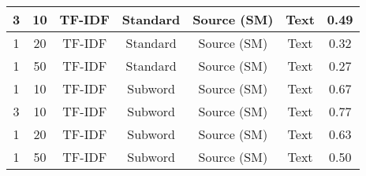 \begin{longtable}{|c|c|c|c|c|c|c|}
\hline
3 & 10 & TF-IDF & Standard & Source (SM) & Text & 0.49 \\
\hline
1 & 20 & TF-IDF & Standard & Source (SM) & Text & 0.32 \\
\hline
1 & 50 & TF-IDF & Standard & Source (SM) & Text & 0.27 \\
\hline
1 & 10 & TF-IDF & Subword & Source (SM) & Text & 0.67 \\
\hline
3 & 10 & TF-IDF & Subword & Source (SM) & Text & 0.77 \\
\hline
1 & 20 & TF-IDF & Subword & Source (SM) & Text & 0.63 \\
\hline
1 & 50 & TF-IDF & Subword & Source (SM) & Text & 0.50 \\
\hline
\end{longtable}
